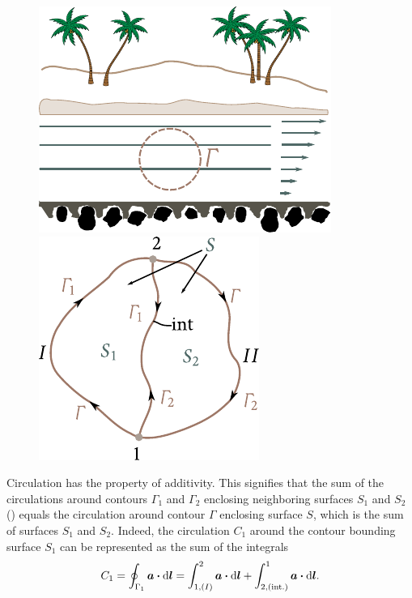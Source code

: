 \begin{figure}[t]
	\begin{minipage}[t]{0.5\linewidth}
		\begin{center}
			\includegraphics[scale=0.95]{figures/ch_01/fig_1_27.pdf}
			\caption[]{}
			\label{fig:1_27}
		\end{center}
	\end{minipage}
	\hspace{-0.05cm}
	\begin{minipage}[t]{0.5\linewidth}
		\begin{center}
			\includegraphics[scale=0.95]{figures/ch_01/fig_1_28.pdf}
			\caption[]{}
			\label{fig:1_28}
		\end{center}
	\end{minipage}
\vspace{-0.6cm}
\end{figure}

Circulation has the property of additivity. This signifies that the sum of the circulations around contours $\Gamma_1$ and $\Gamma_2$ enclosing neighboring surfaces $S_1$ and $S_2$ () equals the circulation around contour $\Gamma$ enclosing surface $S$, which is the sum of surfaces $S_1$ and $S_2$. Indeed, the circulation $C_1$ around the contour bounding surface $S_1$ can be represented as the sum of the integrals
\begin{equation}\label{eq:1_84}
	C_1 = \oint_{\Gamma_1} \boldsymbol{a} \boldsymbol{\cdot} \mathrm{d}\boldsymbol{l} = \int_{1,(I)}^2 \boldsymbol{a} \boldsymbol{\cdot} \mathrm{d}\boldsymbol{l} + \int_{2,(\text{int.})}^1 \boldsymbol{a} \boldsymbol{\cdot} \mathrm{d}\boldsymbol{l}.
\end{equation}

